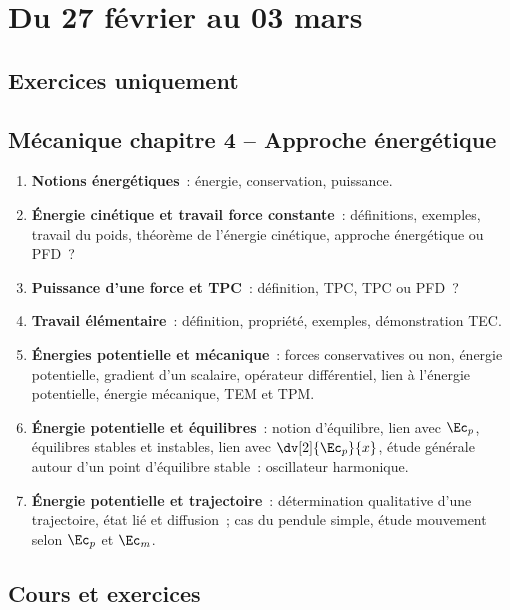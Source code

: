 \documentclass[a4paper, 12pt, final, garamond]{book}
\begin{document}
\setcounter{chapter}{18}

\chapter{Du 27 f\'evrier au 03 mars}

\section{Exercices uniquement}
\section*{Mécanique chapitre 4 -- Approche énergétique}
\begin{enumerate}[label=\Roman*]
    \item \textbf{Notions énergétiques}~: énergie, conservation, puissance.
    \item \textbf{Énergie cinétique et travail force constante}~: définitions,
        exemples, travail du poids, théorème de l'énergie cinétique, approche
        énergétique ou PFD~?
    \item \textbf{Puissance d'une force et TPC}~: définition, TPC, TPC ou PFD~?
    \item \textbf{Travail élémentaire}~: définition, propriété, exemples,
        démonstration TEC.
    \item \textbf{Énergies potentielle et mécanique}~: forces conservatives ou
        non, énergie potentielle, gradient d'un scalaire, opérateur
        différentiel, lien à l'énergie potentielle, énergie mécanique, TEM et
        TPM.
    \item \textbf{Énergie potentielle et équilibres}~: notion d'équilibre, lien
        avec $\Ec_p$, équilibres stables et instables, lien avec
        $\dv[2]{\Ec_p}{x}$, étude générale autour d'un point d'équilibre
        stable~: oscillateur harmonique.
    \item \textbf{Énergie potentielle et trajectoire}~: détermination
        qualitative d'une trajectoire, état lié et diffusion~; cas du pendule
        simple, étude mouvement selon $\Ec_p$ et $\Ec_m$.
\end{enumerate}

\section{Cours et exercices}
\end{document}
